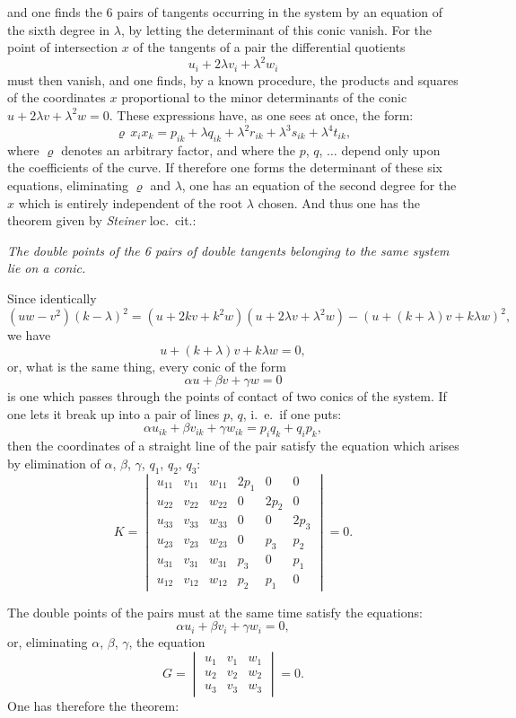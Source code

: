 \documentclass{article}
\begin{document}
and one finds the 6 pairs of tangents occurring in the system by an equation of the sixth degree in $\lambda$, by letting the determinant of this conic vanish. For the point of intersection $x$ of the tangents of a pair the differential quotients
\[
u_{i} + 2\lambda v_{i} + \lambda^{2} w_{i}
\]
must then vanish, and one finds, by a known procedure, the products and squares of the coordinates $x$ proportional to the minor determinants of the conic $u+2\lambda v+\lambda^{2}w = 0$. These expressions have, as one sees at once, the form:
\[
\varrho\, x_{i} x_{k} = p_{ik}+\lambda q_{ik}+\lambda^{2} r_{ik}+\lambda^{3} s_{ik}+\lambda^{4} t_{ik},
\]
where $\varrho$ denotes an arbitrary factor, and where the $p$, $q$, $\ldots$ depend only upon the coefficients of the curve. If therefore one forms the determinant of these six equations, eliminating $\varrho$ and $\lambda$, one has an equation of the second degree for the $x$ which is entirely independent of the root $\lambda$ chosen. And thus one has the theorem given by \emph{Steiner} loc.\ cit.:

\emph{The double points of the 6 pairs of double tangents belonging to the same system lie on a conic.}

Since identically
\[
(uw-v^{2})(k-\lambda)^{2} = (u+2kv+k^{2}w)(u+2\lambda v+\lambda^{2}w)-(u+(k+\lambda)v+k\lambda w)^{2},
\]
we have
\[
u+(k+\lambda)v+k\lambda w = 0,
\]
or, what is the same thing, every conic of the form
\[
\alpha u+\beta v+\gamma w = 0
\]
is one which passes through the points of contact of two conics of the system. If one lets it break up into a pair of lines $p$, $q$, i.\ e.\ if one puts:
\[
\alpha u_{ik}+\beta v_{ik}+\gamma w_{ik} = p_{i} q_{k}+q_{i} p_{k},
\]
then the coordinates of a straight line of the pair satisfy the equation which arises by elimination of $\alpha$, $\beta$, $\gamma$, $q_{1}$, $q_{2}$, $q_{3}$:
\[
K = \begin{vmatrix}
u_{11} & v_{11} & w_{11} & 2p_{1} & 0 & 0\\
u_{22} & v_{22} & w_{22} & 0 & 2p_{2} & 0\\
u_{33} & v_{33} & w_{33} & 0 & 0 & 2p_{3}\\
u_{23} & v_{23} & w_{23} & 0 & p_{3} & p_{2}\\
u_{31} & v_{31} & w_{31} & p_{3} & 0 & p_{1}\\
u_{12} & v_{12} & w_{12} & p_{2} & p_{1} & 0
\end{vmatrix} = 0.
\]


The double points of the pairs must at the same time satisfy the equations:
\[
\alpha u_{i}+\beta v_{i}+\gamma w_{i} = 0,
\]
or, eliminating $\alpha$, $\beta$, $\gamma$, the equation
\[
G = \begin{vmatrix}
u_{1} & v_{1} & w_{1}\\
u_{2} & v_{2} & w_{2}\\
u_{3} & v_{3} & w_{3}
\end{vmatrix} = 0.
\]
One has therefore the theorem:
\end{document}
